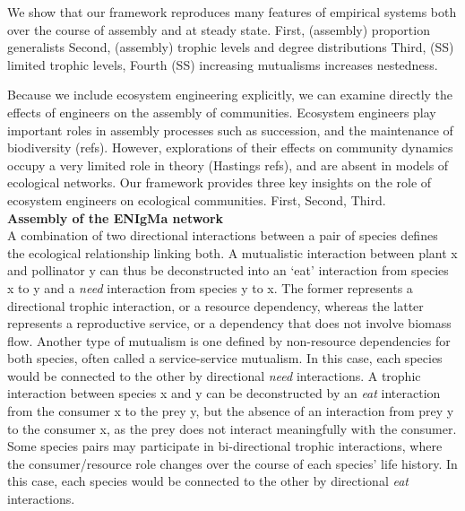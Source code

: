 \documentclass[9pt,twocolumn,twoside]{pnas-new}
\begin{document}
We show that our framework reproduces many features of empirical systems both over the course of assembly and at steady state.
First, (assembly) proportion generalists
Second, (assembly) trophic levels and degree distributions
Third, (SS) limited trophic levels,
Fourth (SS) increasing mutualisms increases nestedness.

Because we include ecosystem engineering explicitly, we can examine directly the effects of engineers on the assembly of communities.
Ecosystem engineers play important roles in assembly processes such as succession, and the maintenance of biodiversity (refs).
However, explorations of their effects on community dynamics occupy a very limited role in theory (Hastings refs), and are absent in models of ecological networks.
Our framework provides three key insights on the role of ecosystem engineers on ecological communities.
First,
Second,
Third.\\

\noindent \textbf{Assembly of the ENIgMa network}\\
A combination of two directional interactions between a pair of species defines the ecological relationship linking both.
A mutualistic interaction between plant x and pollinator y can thus be deconstructed into an `eat' interaction from species x to y and a \emph{need} interaction from species y to x.
The former represents a directional trophic interaction, or a resource dependency, whereas the latter represents a reproductive service, or a dependency that does not involve biomass flow.
Another type of mutualism is one defined by non-resource dependencies for both species, often called a service-service mutualism.
In this case, each species would be connected to the other by directional \emph{need} interactions.
A trophic interaction between species x and y can be deconstructed by an \emph{eat} interaction from the consumer x to the prey y, but the absence of an interaction from prey y to the consumer x, as the prey does not interact meaningfully with the consumer.
Some species pairs may participate in bi-directional trophic interactions, where the consumer/resource role changes over the course of each species' life history.
In this case, each species would be connected to the other by directional \emph{eat} interactions.
\end{document}
